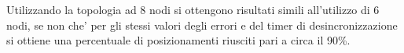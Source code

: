 \documentclass[Lau,binding=0.6cm]{sapthesis}
\begin{document}
Utilizzando la topologia ad 8 nodi si ottengono risultati simili all'utilizzo di 6 nodi, se non che' per gli stessi valori degli errori e del timer di desincronizzazione si ottiene una percentuale di posizionamenti riusciti pari a circa il 90\%.










\backmatter

\clearpage
\label{Bibliography}
\nocite{*}
\printbibliography
\end{document}
